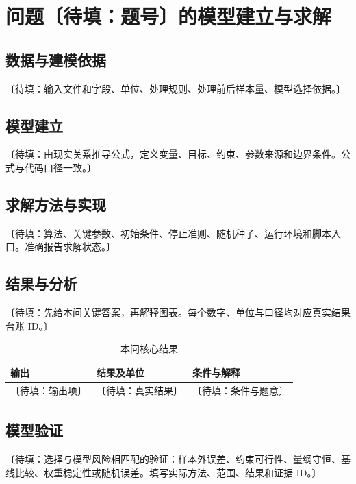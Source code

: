 \documentclass[UTF8,a4paper,zihao=-4,fontset=fandol]{ctexart}
\newcommand{\slot}[1]{〔待填：#1〕}
\begin{document}
\section{问题\slot{题号}的模型建立与求解}
\subsection{数据与建模依据}
\slot{输入文件和字段、单位、处理规则、处理前后样本量、模型选择依据。}

\subsection{模型建立}
\slot{由现实关系推导公式，定义变量、目标、约束、参数来源和边界条件。公式与代码口径一致。}

\subsection{求解方法与实现}
\slot{算法、关键参数、初始条件、停止准则、随机种子、运行环境和脚本入口。准确报告求解状态。}

\subsection{结果与分析}
\slot{先给本问关键答案，再解释图表。每个数字、单位与口径均对应真实结果台账 ID。}
\begin{table}[htbp]
\centering
\caption{本问核心结果}
\label{tab:q1-results}
\small
\begin{tabularx}{\linewidth}{lYY}
\toprule
输出 & 结果及单位 & 条件与解释 \\
\midrule
\slot{输出项} & \slot{真实结果} & \slot{条件与题意} \\
\bottomrule
\end{tabularx}
\end{table}

\subsection{模型验证}
\slot{选择与模型风险相匹配的验证：样本外误差、约束可行性、量纲守恒、基线比较、权重稳定性或随机误差。填写实际方法、范围、结果和证据 ID。}

\end{document}
